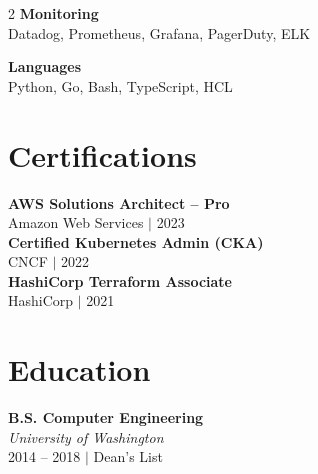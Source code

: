 \documentclass[10pt,letterpaper]{article}
\begin{document}
\begin{multicols}{2}
\textbf{\color{sidebar}Monitoring} \\
{\small Datadog, Prometheus, Grafana, PagerDuty, ELK}
\vspace{4pt}

\textbf{\color{sidebar}Languages} \\
{\small Python, Go, Bash, TypeScript, HCL}

\section{Certifications}

{\small
\textbf{\color{darkgray}AWS Solutions Architect -- Pro} \\
{\color{lightgray}Amazon Web Services $|$ 2023} \\[4pt]
\textbf{\color{darkgray}Certified Kubernetes Admin (CKA)} \\
{\color{lightgray}CNCF $|$ 2022} \\[4pt]
\textbf{\color{darkgray}HashiCorp Terraform Associate} \\
{\color{lightgray}HashiCorp $|$ 2021}
}

\section{Education}

\textbf{\color{darkgray}B.S. Computer Engineering} \\
{\color{accent}\textit{University of Washington}} \\
{\small\color{lightgray} 2014 -- 2018 $|$ Dean's List}

\end{multicols}
\end{document}
